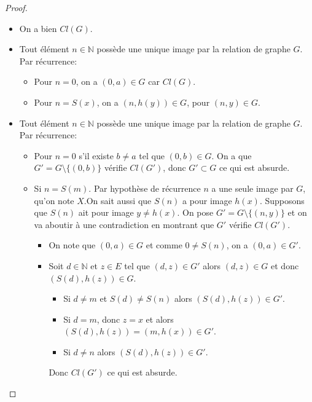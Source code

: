 \begin{proof}
	\begin{itemize}
		\item On a bien $Cl(G)$.
		\item Tout élément $n \in \mathbb{N}$ possède une unique image par la relation de graphe $G$. Par récurrence:
		      \begin{itemize}
			      \item Pour $n = 0$, on a $(0,a) \in G$ car $Cl(G)$.
			      \item Pour $n = S(x)$, on a $(n, h(y)) \in G$, pour $(n,y) \in G$.
		      \end{itemize}
		\item Tout élément $n \in \mathbb{N}$ possède une unique image par la relation de graphe $G$. Par récurrence:
		      \begin{itemize}
			      \item Pour $n = 0$ s'il existe $b \neq a$ tel que $(0,b) \in G$. On a que $G' = G \setminus \{(0,b)\}$ vérifie $Cl(G')$, donc
			            $G' \subset G$ ce qui est absurde.
			      \item Si $n = S(m)$. Par hypothèse de récurrence $n$ a une seule image par $G$, qu'on note $X$.On sait aussi que $S(n)$ a pour image $h(x)$.
			            Supposons que $S(n)$ ait pour image $y \neq h(x)$. On pose $G' = G \setminus \{(n,y)\}$ et on va aboutir à une contradiction en montrant que $G'$ vérifie $Cl(G')$.
			            \begin{itemize}
				            \item On note que $(0,a) \in G$ et comme $0 \neq S(n)$, on a $(0,a) \in G'$.
				            \item Soit $d \in \mathbb{N}$ et $z \in E$ tel que $(d,z) \in G'$ alors $(d,z) \in G$ et donc $(S(d), h(z)) \in G$.
				                  \begin{itemize}
					                  \item Si $d \neq m$ et $S(d) \neq S(n)$ alors $(S(d), h(z)) \in G'$.
					                  \item Si $d = m$, donc $z = x$ et alors $(S(d), h(z)) = (m, h(x)) \in G'$.
					                  \item Si $d \neq n$ alors $(S(d), h(z)) \in G'$.
				                  \end{itemize}
				                  Donc $Cl(G')$ ce qui est absurde.
			            \end{itemize}
		      \end{itemize}
	\end{itemize}
\end{proof}



